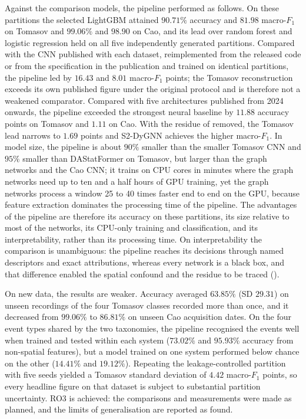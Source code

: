 Against the comparison models, the pipeline performed as follows. On these partitions the selected LightGBM attained $90.71\%$ accuracy and $81.98$ macro-$F_1$ on Tomasov and $99.06\%$ and $98.90$ on Cao, and its lead over random forest and logistic regression held on all five independently generated partitions. Compared with the CNN published with each dataset, reimplemented from the released code or from the specification in the publication and trained on identical partitions, the pipeline led by $16.43$ and $8.01$ macro-$F_1$ points; the Tomasov reconstruction exceeds its own published figure under the original protocol and is therefore not a weakened comparator. Compared with five architectures published from 2024 onwards, the pipeline exceeded the strongest neural baseline by $11.88$ accuracy points on Tomasov and $1.11$ on Cao. With the residue of  removed, the Tomasov lead narrows to $1.69$ points and S2-DyGNN achieves the higher macro-$F_1$. In model size, the pipeline is about $90\%$ smaller than the smaller Tomasov CNN and $95\%$ smaller than DAStatFormer on Tomasov, but larger than the graph networks and the Cao CNN; it trains on CPU cores in minutes where the graph networks need up to ten and a half hours of GPU training, yet the graph networks process a window 25 to 40 times faster end to end on the GPU, because feature extraction dominates the processing time of the pipeline. The advantages of the pipeline are therefore its accuracy on these partitions, its size relative to most of the networks, its CPU-only training and classification, and its interpretability, rather than its processing time. On interpretability the comparison is unambiguous: the pipeline reaches its decisions through named descriptors and exact attributions, whereas every network is a black box, and that difference enabled the spatial confound and the residue to be traced ().

On new data, the results are weaker. Accuracy averaged $63.85\%$ (SD $29.31$) on unseen recordings of the four Tomasov classes recorded more than once, and it decreased from $99.06\%$ to $86.81\%$ on unseen Cao acquisition dates. On the four event types shared by the two taxonomies, the pipeline recognised the events well when trained and tested within each system ($73.02\%$ and $95.93\%$ accuracy from non-spatial features), but a model trained on one system performed below chance on the other ($14.41\%$ and $19.12\%$). Repeating the leakage-controlled partition with five seeds yielded a Tomasov standard deviation of $4.42$ macro-$F_1$ points, so every headline figure on that dataset is subject to substantial partition uncertainty. RO3 is achieved: the comparisons and measurements were made as planned, and the limits of generalisation are reported as found.

